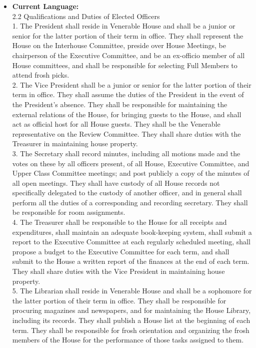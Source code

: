 \documentclass[10pt]{article} %
\begin{document}
\begin{itemize}
    \item \textbf{Current Language:} \\
        2.2 Qualifications and Duties of Elected Officers \\
        1. The President shall reside in Venerable House and shall be a junior or senior for the latter portion of their term in office. They shall represent the House on the Interhouse Committee, preside over House Meetings, be chairperson of the Executive Committee, and be an ex-officio member of all House committees, and shall be responsible for selecting Full Members to attend frosh picks. \\
        2. The Vice President shall be a junior or senior for the latter portion of their term in office. They shall assume the duties of the President in the event of the President's absence. They shall be responsible for maintaining the external relations of the House, for bringing guests to the House, and shall act as official host for all House guests. They shall be the Venerable representative on the Review Committee. They shall share duties with the Treasurer in maintaining house property. \\
        3. The Secretary shall record minutes, including all motions made and the votes on these by all officers present, of all House, Executive Committee, and Upper Class Committee meetings; and post publicly a copy of the minutes of all open meetings. They shall have custody of all House records not specifically delegated to the custody of another officer, and in general shall perform all the duties of a corresponding and recording secretary. They shall be responsible for room assignments. \\
        4. The Treasurer shall be responsible to the House for all receipts and expenditures, shall maintain an adequate book-keeping system, shall submit a report to the Executive Committee at each regularly scheduled meeting, shall propose a budget to the Executive Committee for each term, and shall submit to the House a written report of the finances at the end of each term. They shall share duties with the Vice President in maintaining house property. \\
        5. The Librarian shall reside in Venerable House and shall be a sophomore for the latter portion of their term in office. They shall be responsible for procuring magazines and newspapers, and for maintaining the House Library, including its records. They shall publish a House list at the beginning of each term. They shall be responsible for frosh orientation and organizing the frosh members of the House for the performance of those tasks assigned to them. \\

\end{itemize}
\end{document}
